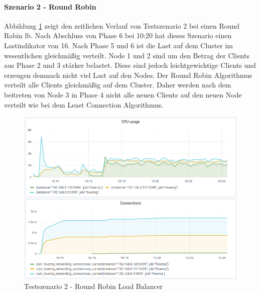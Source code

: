\paragraph{Szenario 2 - Round Robin}
Abbildung \ref{fig:s2-rr} zeigt den zeitlichen Verlauf von Testszenario 2 bei einen Round Robin \ac{lb}.
Nach Abschluss von Phase 6 bei 10:20 hat dieses Szenario einen Lastindikator von 16.
Nach Phase 5 und 6 ist die Last auf dem Cluster im wesentlichen gleichmä{\ss}ig verteilt. Node 1 und 2 sind um den Betrag der Clients aus Phase 2 und 3 stärker belastet. Diese sind jedoch leichtgewichtige Clients und erzeugen demnach nicht viel Last auf den Nodes.
Der Round Robin Algorithmus verteilt alle Clients gleichmä{\ss}ig auf dem Cluster. Daher werden nach dem beitreten von Node 3 in Phase 4 nicht alle neuen Clients auf den neuen Node verteilt wie bei dem Least Connection Algorithmus.
\begin{figure}
    \centering
    \includegraphics[scale=0.8]{images/s2_rr.png}
    \caption{Testszenario 2 - Round Robin Load Balancer}
    \label{fig:s2-rr}
\end{figure}

